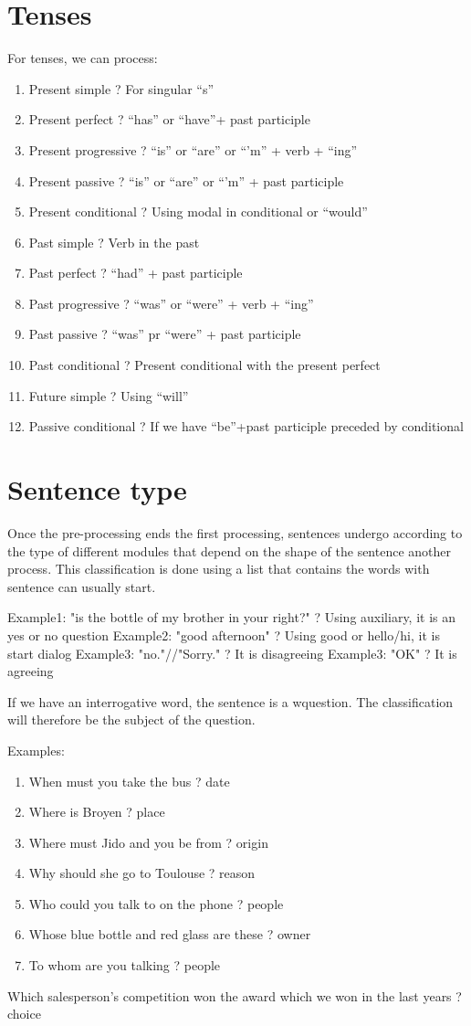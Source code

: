 \documentclass[twoside,a4paper,10pt]{report}
\newcommand{\dokutitleleveltree}[1]{\section{#1}}
\newcommand{\dokuitem}{\item}
\begin{document}
\dokutitleleveltree{Tenses}
\label{7664bb61dad550e6b91636502af4e390}%
For tenses, we can process:


\begin{enumerate}\dokuitem  Present simple ? For singular “s”
\dokuitem  Present perfect ? “has” or “have”+ past participle
\dokuitem  Present progressive ? “is” or “are” or “’m” + verb + “ing”
\dokuitem  Present passive ? “is” or “are” or “’m” + past participle
\dokuitem  Present conditional ? Using modal in conditional or “would”
\dokuitem  Past simple ? Verb in the past
\dokuitem  Past perfect ? “had” + past participle
\dokuitem  Past progressive ? “was” or “were” + verb + “ing”
\dokuitem  Past passive ? “was” pr “were” + past participle
\dokuitem  Past conditional ? Present conditional with the present perfect
\dokuitem  Future simple ? Using “will”
\dokuitem  Passive conditional ? If we have “be”+past participle preceded by conditional
\end{enumerate}

\dokutitleleveltree{Sentence type}
\label{1cae782fdfad8b38f1b3641092175803}%
Once the pre-processing ends the first processing, sentences undergo according to the type of different modules that depend on the shape of the sentence another process. This classification is done using a list that contains the words with sentence can usually start.


\small
\begin{verbatimtab}
  Example1: "is the bottle of my brother in your right?"
  ? Using auxiliary, it is an yes or no question
  Example2: "good afternoon"
  ? Using good or hello/hi, it is start dialog 
  Example3: "no."//"Sorry."
  ? It is disagreeing
  Example3: "OK"
  ? It is agreeing
\end{verbatimtab}
\normalsize
If we have an interrogative word, the sentence is a w{\textunderscore}question. The classification will therefore be the subject of the question. 

Examples:


\begin{enumerate}\dokuitem  When must you take the bus ? date
\dokuitem  Where is Broyen ? place
\dokuitem  Where must Jido and you be from ? origin
\dokuitem  Why should she go to Toulouse ? reason
\dokuitem  Who could you talk to on the phone ? people
\dokuitem  Whose blue bottle and red glass are these ? owner
\dokuitem  To whom are you talking ? people
\end{enumerate}

Which salesperson's competition won the award which we won in the last years ? choice
\end{document}
